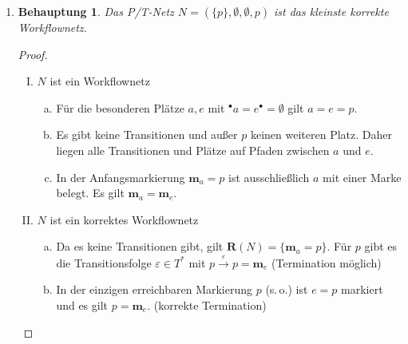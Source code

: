 \documentclass[a4paper]{scrartcl}
\newtheorem*{behaupt}{Behauptung}
\begin{document}
\begin{enumerate}
    \item
        \begin{behaupt}
            Das P/T-Netz $N = ( \{ p \}, \emptyset, \emptyset, p)$ ist das
            kleinste korrekte Workflownetz.
        \end{behaupt}
        \begin{proof} \hfill \\
            \begin{enumerate}[I.]
                \item $N$ ist ein Workflownetz
                    \begin{enumerate}[a)]
                        \item
                            Für die besonderen Plätze $a, e$ mit
                            $^\bullet a = e^\bullet = \emptyset$
                            gilt $a = e = p$.

                        \item
                            Es gibt keine Transitionen und außer $p$ keinen
                            weiteren Platz.
                            Daher liegen alle Transitionen und Plätze auf
                            Pfaden zwischen $a$ und $e$.

                        \item
                            In der Anfangsmarkierung $\textbf{m}_a = p$ ist
                            ausschließlich $a$ mit einer Marke belegt.
                            Es gilt $\textbf{m}_a = \textbf{m}_e$.

                    \end{enumerate}

                \item $N$ ist ein korrektes Workflownetz
                    \begin{enumerate}[a)]
                        \item
                            Da es keine Transitionen gibt, gilt
                            $\textbf{R}(N) = \{ \textbf{m}_a = p \}$.
                            Für $p$ gibt es die Transitionsfolge
                            $\varepsilon \in T^*$ mit
                            $p \stackrel{\varepsilon}{\to} p = \textbf{m}_e$
                            (Termination möglich)

                        \item
                            In der einzigen erreichbaren Markierung $p$ (s.\,o.)
                            ist $e = p$ markiert und es gilt $p = \textbf{m}_e$.
                            (korrekte Termination)


\end{enumerate}
\end{enumerate}
\end{proof}
\end{enumerate}
\end{document}
